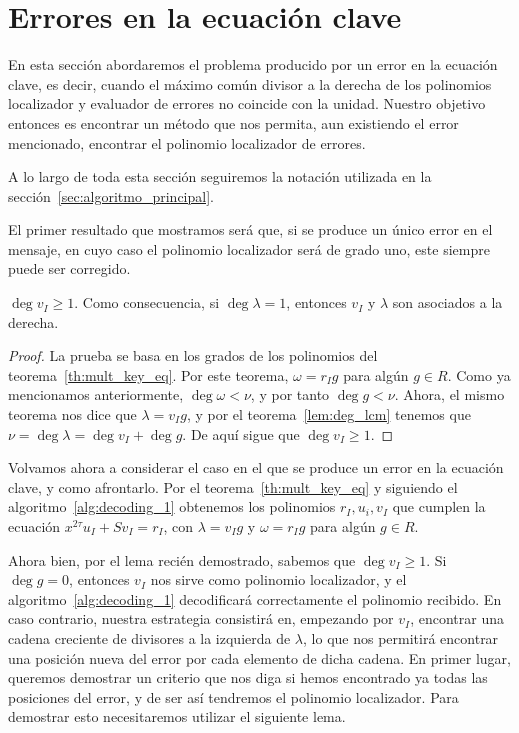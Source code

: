 \section{Errores en la ecuación clave}%
\label{sec:errores_en_ecuación_clave}

En esta sección abordaremos el problema producido por un error en la ecuación clave, es decir, cuando el máximo común divisor a la derecha de los polinomios localizador y evaluador de errores no coincide con la unidad. Nuestro objetivo entonces es encontrar un método que nos permita, aun existiendo el error mencionado, encontrar el polinomio localizador de errores.

A lo largo de toda esta sección seguiremos la notación utilizada en la sección~\ref{sec:algoritmo_principal}.

El primer resultado que mostramos será que, si se produce un único error en el mensaje, en cuyo caso el polinomio localizador será de grado uno, este siempre puede ser corregido.

\begin{lemma}
    \(\deg v_I \ge 1\). Como consecuencia, si \(\deg \lambda = 1\), entonces  \(v_I\) y  \(\lambda\) son asociados a la derecha.
\end{lemma}

\begin{proof}
    La prueba se basa en los grados de los polinomios del teorema~\ref{th:mult_key_eq}. Por este teorema, \(\omega = r_I g\) para algún \(g \in R\). Como ya mencionamos anteriormente, \(\deg \omega < \nu\), y por tanto \(\deg g < \nu\). Ahora, el mismo teorema nos dice que \(\lambda = v_I g\), y por el teorema~\ref{lem:deg_lcm} tenemos que \(\nu = \deg \lambda = \deg v_{I} + \deg g\). De aquí sigue que \(\deg v_I \ge 1\).
\end{proof}

Volvamos ahora a considerar el caso en el que se produce un error en la ecuación clave, y como afrontarlo. Por el teorema~\ref{th:mult_key_eq} y siguiendo el algoritmo~\ref{alg:decoding_1} obtenemos los polinomios \(r_I, u_i, v_I\) que cumplen la ecuación \(x^{2\tau}u_{I} + Sv_{I} = r_{I}\), con \(\lambda = v_I g\) y  \(\omega = r_I g\) para algún \(g \in R\).

Ahora bien, por el lema recién demostrado, sabemos que \(\deg v_I \ge 1\). Si \(\deg g = 0\), entonces \(v_I\) nos sirve como polinomio localizador, y el algoritmo~\ref{alg:decoding_1} decodificará correctamente el polinomio recibido. En caso contrario, nuestra estrategia consistirá en, empezando por \(v_I\), encontrar una cadena creciente de divisores a la izquierda de \(\lambda\), lo que nos permitirá encontrar una posición nueva del error por cada elemento de dicha cadena. En primer lugar, queremos demostrar un criterio que nos diga si hemos encontrado ya todas las posiciones del error, y de ser así tendremos el polinomio localizador. Para demostrar esto necesitaremos utilizar el siguiente lema.

